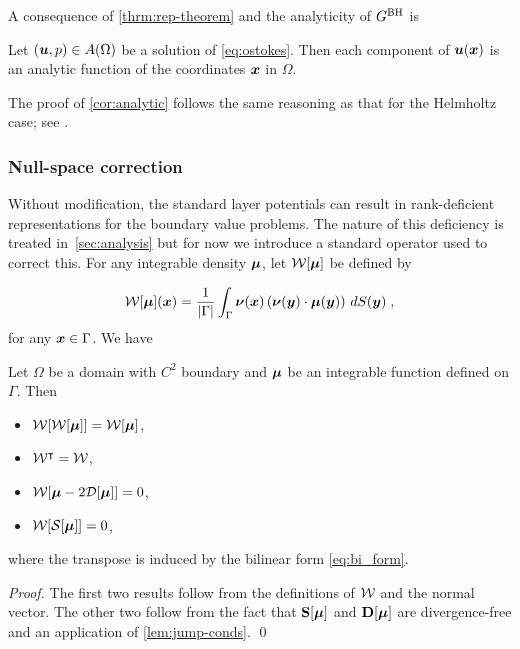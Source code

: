 A consequence of \cref{thrm:rep-theorem} and the analyticity
of $G^{\textrm{BH}}$ is 
\begin{corollary}
\label{cor:analytic}  
  Let $({\boldsymbol u},p) \in A(\Omega)$ be a solution of \cref{eq:ostokes}.
  Then each component of ${\boldsymbol u}({\boldsymbol x})$ is an analytic function
  of the coordinates ${\boldsymbol x}$ in $\Omega$.
\end{corollary}

The proof of \cref{cor:analytic} follows the same reasoning as
that for the Helmholtz case; see \cite[Theorem 3.5]{colton1983integral}.


\subsubsection{Null-space correction \label{subsubsec:nullspacecorr}}

Without modification, the standard layer potentials
can result in rank-deficient representations for
the boundary value problems. The nature of this deficiency
is treated in~\cref{sec:analysis} but for now we introduce a standard
operator used to correct this. For any integrable density
${\boldsymbol \mu}$, let ${\mathcal W}[{\boldsymbol \mu}]$ be defined by

\begin{equation} \label{eq:ones_operator}
  {\mathcal W}[{\boldsymbol \mu}]({\boldsymbol x}) = \frac{1}{|\Gamma|} \int_\Gamma {\boldsymbol \nu}({\boldsymbol x})
  \left ( {\boldsymbol \nu}({\boldsymbol y}) \cdot {\boldsymbol \mu}({\boldsymbol y}) \right )
  \, dS({\boldsymbol y}) \; ,
\end{equation}
for any ${\boldsymbol x} \in \Gamma$. We have

\begin{lemma}
  \label{lem:propnullspacecorr}

  Let $\Omega$ be a domain with $C^2$ boundary and ${\boldsymbol \mu}$ be
  an integrable function defined on $\Gamma$. Then
  \begin{itemize}
  \item ${\mathcal W}[{\mathcal W}[{\boldsymbol \mu}]] = {\mathcal W}[{\boldsymbol \mu}]$,
  \item ${\mathcal W}^\intercal = {\mathcal W}$,
  \item ${\mathcal W}[{\boldsymbol \mu} - 2 {\mathcal D}[{\boldsymbol \mu}]] = 0$,
  \item ${\mathcal W}[{\mathcal S}[{\boldsymbol \mu}]] = 0$,
  \end{itemize}
  where the transpose is induced by the bilinear
  form \cref{eq:bi_form}.
\end{lemma}

\begin{proof}
  The first two results follow from the definitions of ${\mathcal W}$ and
  the normal vector. The other two follow from the fact that
  ${\bf S}[{\boldsymbol \mu}]$ and ${\bf D}[{\boldsymbol \mu}]$ are divergence-free and
  an application of \cref{lem:jump-conds}.
\qed
\end{proof}

